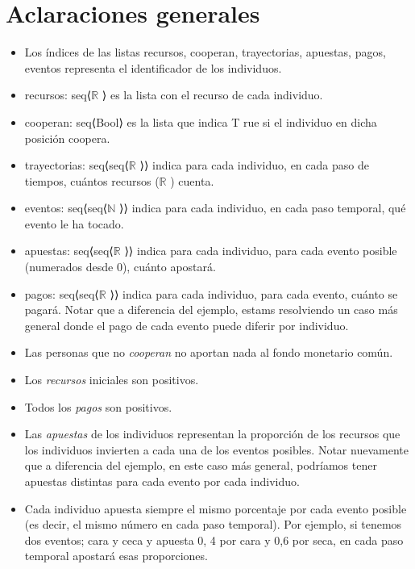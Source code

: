 \documentclass[10pt,a4paper]{article}
\begin{document}
\maketitle

\section{Aclaraciones generales} 


\begin{itemize}
	\item Los índices de las listas recursos, cooperan, trayectorias, apuestas, pagos, eventos representa el identificador de los
    individuos.
	\item recursos: seq⟨$%
    \mathbb{R}
    $%
    ⟩ es la lista con el recurso de cada individuo.
	\item cooperan: seq⟨Bool⟩ es la lista que indica T rue si el individuo en dicha posición coopera.
	\item trayectorias: seq⟨seq⟨$%
    \mathbb{R}
    $%
    ⟩⟩ indica para cada individuo, en cada paso de tiempos, cuántos recursos ($%
    \mathbb{R}
    $%
    ) cuenta.
	\item eventos: seq⟨seq⟨$%
    \mathbb{N}
    $%
    ⟩⟩ indica para cada individuo, en cada paso temporal, qué evento le ha tocado.
	\item apuestas: seq⟨seq⟨$%
    \mathbb{R}
    $%
    ⟩⟩ indica para cada individuo, para cada evento posible (numerados desde 0), cuánto apostará.
	\item pagos: seq⟨seq⟨$%
    \mathbb{R}
    $%
    ⟩⟩ indica para cada individuo, para cada evento, cuánto se pagará. Notar que a diferencia del ejemplo, estams resolviendo un caso más general donde el pago de cada evento puede diferir por individuo.
	\item Las personas que no \textit{cooperan} no aportan nada al fondo monetario común.
	\item Los \textit{recursos} iniciales son positivos.
	\item Todos los \textit{pagos} son positivos.
	\item Las \textit{apuestas} de los individuos representan la proporción de los recursos que los individuos invierten a cada una de los eventos posibles. Notar nuevamente que a diferencia del ejemplo, en este caso más general, podríamos tener apuestas distintas para cada evento por cada individuo.
	\item Cada individuo apuesta siempre el mismo porcentaje por cada evento posible (es decir, el mismo número en cada paso temporal). Por ejemplo, si tenemos dos eventos; cara y ceca y apuesta 0, 4 por cara y 0,6 por seca, en cada paso temporal apostará esas proporciones.
    
\end{itemize}
\end{document}
